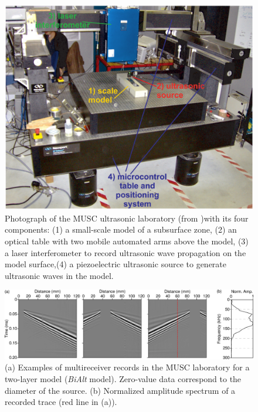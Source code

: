 \documentclass[extra,mreferee]{gji}
\newcommand{\bialt}{\textit{BiAlt} }
\begin{document}
\begin{figure}
\centering
\includegraphics[width=0.50\columnwidth]{Fig/Fig01.eps}
\caption{Photograph of the MUSC ultrasonic laboratory (from \cite{bretaudeau2013fwi} )with its four components: (1) a small-scale model of a subsurface zone, (2) an optical table with two mobile automated arms above the model, (3) a laser interferometer to record ultrasonic wave propagation on the model surface,(4) a piezoelectric ultrasonic source to generate ultrasonic waves in the model.}
\label{Fig:Fig01}
\end{figure}

\clearpage
\newpage

\begin{figure}
\centering
\includegraphics[width=1.00\columnwidth]{Fig/Fig02.eps}
\caption{(a) Examples of multireceiver records in the MUSC laboratory for a two-layer model (\bialt model). Zero-value data correspond to the diameter of the source. (b) Normalized amplitude spectrum of a recorded trace (red line in (a)).}
\label{Fig:Fig02}
\end{figure}

\clearpage
\newpage
\end{document}
